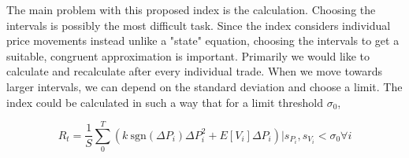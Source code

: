 \documentclass[11pt,a4paper]{article}
\begin{document}
The main problem with this proposed index is the calculation. Choosing the intervals is possibly the most difficult task. Since the index considers individual price movements instead unlike a "state" equation, choosing the intervals to get a suitable, congruent approximation is important. Primarily we would like to calculate and recalculate after every individual trade. When we move towards larger intervals, we can depend on the standard deviation and choose a limit. The index could be calculated in such a way that for a limit threshold $\sigma_0$,

$$
R_t =  \frac{1}{S} \sum_0^T \left( k\ \text{sgn} (\Delta P_i) \Delta P_i^2  + E \left[ V_i \right] \Delta P_i \right) | s_{P_i}, s_{V_i} < \sigma_0 \forall i
$$
\end{document}
